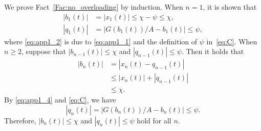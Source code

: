 \documentclass[10pt,twocolumn,twoside]{IEEEtran}
\begin{document}
We prove Fact~\ref{Fac:no_overloading} by induction.
When $n=1$, it is shown that
\begin{align}
	|b_1(t)| &= |{x}_1(t)|  \le \chi - \psi \le \chi, \label{eq:app1_1} \\
	|q_1(t)| &= |G(b_1(t))/A-b_1(t)| \le \psi, \label{eq:app1_2}
\end{align}
where \eqref{eq:app1_2} is due to \eqref{eq:app1_1} and the definition of $\psi$ in~\eqref{eq:C}.
When $n \ge 2$, suppose that $|b_{n-1}(t)| \le \chi$ and $|q_{n-1}(t)| \le \psi$.
Then it holds that
\begin{equation}\label{eq:app1_4}
	\begin{aligned}
		|b_{n}(t)| &= |{x}_n(t) - q_{n-1}(t)| \\
		&\le |{x}_n(t)| + |q_{n-1}(t)| \\
		&\le \chi.
	\end{aligned}
\end{equation}
By \eqref{eq:app1_4} and \eqref{eq:C}, we have
\[
|q_n(t)| = |G(b_n(t))/A- b_n(t)| \le \psi.
\]
Therefore, $|b_{n}(t)| \le  \chi$ and $|q_{n}(t)| \le  \psi$ hold for all $n$.





%

\end{document}
